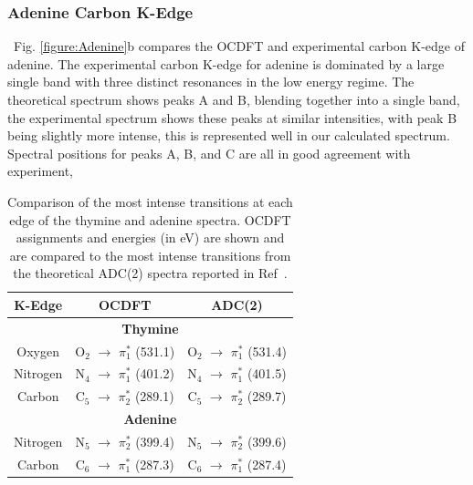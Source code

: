 \documentclass[8.5pt,twoside,twocolumn]{article}
\begin{document}
\subsubsection{Adenine Carbon K-Edge}
\ Fig. \ref{figure:Adenine}b compares the OCDFT and experimental carbon K-edge of adenine. The experimental carbon K-edge for adenine is dominated by a large single band with three distinct resonances in the low energy regime. The theoretical spectrum shows peaks A and B, blending together into a single band, the experimental spectrum shows these peaks at similar intensities, with peak B being slightly more intense, this is represented well in our calculated spectrum. Spectral positions for peaks A, B, and C are all in good agreement with experiment, 
\begin{table}
\caption{Comparison of the most intense transitions at each edge of the thymine and adenine spectra. OCDFT assignments and energies (in eV) are shown and are compared to the most intense transitions from the theoretical ADC(2) spectra reported in Ref~.}
\small
\centering
\begin{tabular}{ccc}
\hline
\hline
K-Edge & OCDFT & ADC(2) \\
\hline
\multicolumn{3}{c}{\bf Thymine} \\
Oxygen  & O$_2$ $\rightarrow$ $\pi^*_1$ (531.1) &  O$_2$ $\rightarrow$ $\pi^*_1$ (531.4)  \\
Nitrogen  & N$_4$ $\rightarrow$ $\pi^*_1$ (401.2) & N$_4$ $\rightarrow$ $\pi^*_1$ (401.5) \\
Carbon  & C$_5$ $\rightarrow$ $\pi^*_2$ (289.1) & C$_5$ $\rightarrow$ $\pi^*_2$ (289.7) 
\\[2pt]
\multicolumn{3}{c}{\bf Adenine} \\
Nitrogen &  N$_5$ $\rightarrow$ $\pi^*_2$ (399.4) & N$_5$ $\rightarrow$ $\pi^*_2$ (399.6) \\
Carbon  & C$_6$ $\rightarrow$ $\pi^*_1$ (287.3) & C$_6$ $\rightarrow$ $\pi^*_1$ (287.4)\\[2pt]
\hline
\hline
\end{tabular}
\label{table: assignment_comparison}
\end{table}
\end{document}
